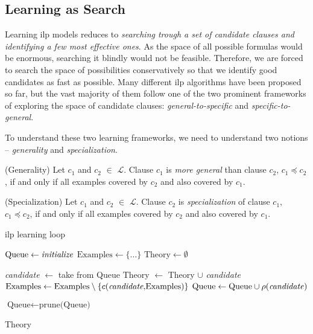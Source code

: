 \subsection{Learning as Search}

Learning \gls{ilp} models reduces to \textit{searching trough a set of candidate clauses and identifying a few most effective ones}.
As the space of all possible formulas would be enormous, searching it blindly would not be feasible.
Therefore, we are forced to search the space of possibilities conservatively so that we identify good candidates as fast as possible.
Many different \gls{ilp} algorithms have been proposed so far, but the vast majority of them follow one of the two prominent frameworks of exploring the space of candidate clauses: \textit{general-to-specific} and \textit{specific-to-general}.



To understand these two learning frameworks, we need to understand two notions -- \textit{generality} and \textit{specialization}.

\begin{definition}{(Generality)}
Let $c_1$ and $c_2$ $\in$ $\mathcal{L}$. 
Clause $c_1$ is \textit{more general} than clause $c_2$, $c_1 \preceq c_2$, if and only if all examples covered by $c_2$ and also covered by $c_1$. 
\end{definition}



\begin{definition}{(Specialization)}
Let $c_1$ and $c_2$ $\in$ $\mathcal{L}$. 
Clause $c_2$ is \textit{specialization} of clause $c_1$, $c_1 \preceq c_2$, if and only if all examples covered by $c_2$ and also covered by $c_1$. 
\end{definition}




\begin{algorithm}
	
	\caption{\gls{ilp} learning loop}
	\begin{algorithmic}
		\STATE $\text{Queue} \leftarrow \text{\textit{initialize}}$
		\STATE $\text{Examples} \leftarrow \{\text{\ldots}\}$
		\STATE $\text{Theory} \leftarrow \emptyset$
		
			\STATE \textit{candidate} $\leftarrow$ take from Queue
				\STATE Theory $\leftarrow$ Theory $\cup$ \textit{candidate}
				\STATE $\text{Examples} \leftarrow \text{Examples} \setminus \{c(\text{\textit{candidate},Examples})\}$
			\ELSE
				\STATE $\text{Queue} \leftarrow \text{Queue} \cup \rho(\text{\textit{candidate}})$
			\ENDIF
			
			\STATE $\text{Queue} \leftarrow \text{prune(Queue)}$
				
		\ENDWHILE
		\RETURN Theory
		
	\end{algorithmic}
	\label{alg:ilploop}
\end{algorithm}


